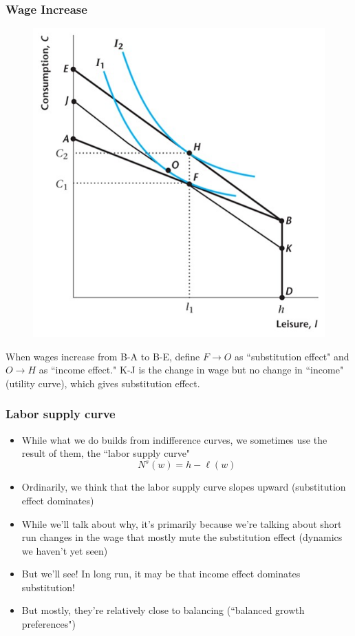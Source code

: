 \documentclass{beamer}
\begin{document}
\begin{frame}
\frametitle[alignment=center]{Wage Increase}
\begin{figure}
\centering
\includegraphics[scale=0.5]{Figures/W_Fig_4pt8.png}
\end{figure}
When wages increase from B-A to B-E, define $F\rightarrow O$ as ``substitution effect" and $O\rightarrow H$ as ``income effect."  K-J is the change in wage but no change in ``income" (utility curve), which gives substitution effect.
\end{frame}

\begin{frame}
\frametitle[alignment=center]{Labor supply curve}
\begin{itemize}
\item While what we do builds from indifference curves, we sometimes use the result of them, the ``labor supply curve"
$$N^s(w)=h-\ell(w)$$
\item Ordinarily, we think that the labor supply curve slopes upward (substitution effect dominates)
\bigskip
\item While we'll talk about why, it's primarily because we're talking about short run changes in the wage that mostly mute the substitution effect (dynamics we haven't yet seen)
\bigskip
\item But we'll see!  In long run, it may be that income effect dominates substitution!
\bigskip
\item But mostly, they're relatively close to balancing (``balanced growth preferences")
\end{itemize}
\end{frame}
\end{document}
